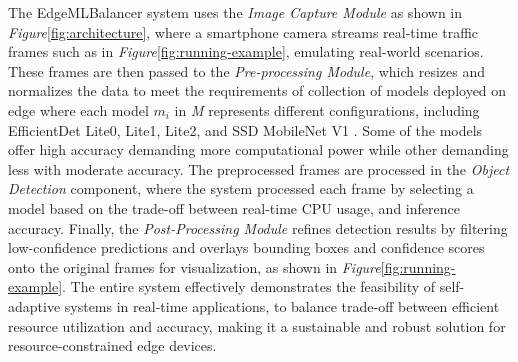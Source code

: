 The EdgeMLBalancer system uses the \textit{Image Capture Module} as shown in \textit{Figure}\ref{fig:architecture}, where a smartphone camera streams real-time traffic frames such as in \textit{Figure}\ref{fig:running-example}, emulating real-world scenarios. These frames are then passed to the \textit{Pre-processing Module}, which resizes and normalizes the data to meet the requirements of collection of models deployed on edge where each model \(m_i\) in \textit{M} represents different configurations, including EfficientDet Lite0, Lite1, Lite2, and SSD MobileNet V1 \cite{b36}\cite{b37}. Some of the models offer high accuracy demanding more computational power while other demanding less with moderate accuracy. The preprocessed frames are processed in the \textit{Object Detection} component, where the system processed each frame by selecting a model based on the trade-off between real-time CPU usage, and inference accuracy. Finally, the \textit{Post-Processing Module} refines detection results by filtering low-confidence predictions and overlays bounding boxes and confidence scores onto the original frames for visualization, as shown in \textit{Figure}\ref{fig:running-example}. The entire system effectively demonstrates the feasibility of self-adaptive systems in real-time applications, to balance trade-off between efficient resource utilization and accuracy, making it a sustainable and robust solution for resource-constrained edge devices. 